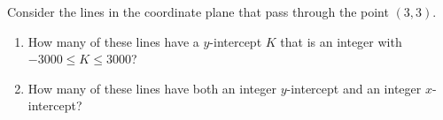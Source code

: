 Consider the lines in the coordinate plane that pass through the point $(3,3)$.
\begin{enumerate}
\item[(a)] How many of these lines have a $y$-intercept $K$ that is an integer with $-3000\le K\le3000$?
\item[(b)] How many of these lines have both an integer $y$-intercept and an integer $x$-intercept?
\end{enumerate}
